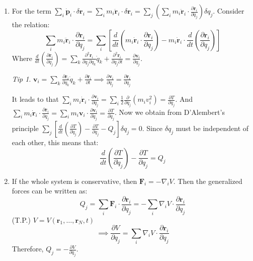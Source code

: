 \documentclass[12pt,a4paper]{article}
\theoremstyle{definition}
\theoremstyle{remark}
\newtheorem*{tip}{Tip}
\renewcommand{\vec}[1]{\mathbf{#1}}
\begin{document}
\begin{enumerate}
		\item For the term $\sum_i \dot{\vec{p}}_i \cdot \delta\vec{r}_i = \sum_i m_i \ddot{\vec{r}}_i \cdot \delta\vec{r}_i = \sum_j \left( \sum_i m_i \ddot{\vec{r}}_i \cdot \frac{\partial \vec{r}_i}{\partial q_j} \right) \delta q_j$.
		Consider the relation:
		\begin{equation*}
			\sum_i m_i \ddot{\vec{r}}_i \cdot \frac{\partial \vec{r}_i}{\partial q_j} = \sum_i \left[ \frac{d}{dt} \left( m_i \dot{\vec{r}}_i \cdot \frac{\partial \vec{r}_i}{\partial q_j} \right) - m_i \dot{\vec{r}}_i \cdot \frac{d}{dt} \left( \frac{\partial \vec{r}_i}{\partial q_j} \right) \right]
		\end{equation*}
		Where $\frac{d}{dt}(\frac{\partial \vec{r}_i}{\partial q_j}) = \sum_k \frac{\partial^2 \vec{r}_i}{\partial q_j \partial q_k}\dot{q}_k + \frac{\partial^2 \vec{r}_i}{\partial q_j \partial t} = \frac{\partial \vec{v}_i}{\partial q_j}$.
		\begin{tip}
			$\vec{v}_i = \sum_k \frac{\partial \vec{r}_i}{\partial q_k}\dot{q}_k + \frac{\partial \vec{r}_i}{\partial t} \implies \frac{\partial \vec{v}_i}{\partial \dot{q}_j} = \frac{\partial \vec{r}_i}{\partial q_j}$
		\end{tip}
		It leads to that $\sum_i m_i \dot{\vec{r}}_i \cdot \frac{\partial \vec{v}_i}{\partial q_j} = \sum_i \frac{1}{2} \frac{\partial}{\partial q_j}(m_i v_i^2) = \frac{\partial T}{\partial q_j}$.
		And $\sum_i m_i \dot{\vec{r}}_i \cdot \frac{\partial \vec{r}_i}{\partial q_j} = \sum_i m_i \vec{v}_i \cdot \frac{\partial \vec{v}_i}{\partial \dot{q}_j} = \frac{\partial T}{\partial \dot{q}_j}$.
		Now we obtain from D'Alembert's principle $\sum_j \left[ \frac{d}{dt}\left(\frac{\partial T}{\partial \dot{q}_j}\right) - \frac{\partial T}{\partial q_j} - Q_j \right] \delta q_j = 0$.
		Since $\delta q_j$ must be independent of each other, this means that:
		\begin{equation*}
			\frac{d}{dt}\left(\frac{\partial T}{\partial \dot{q}_j}\right) - \frac{\partial T}{\partial q_j} = Q_j
		\end{equation*}
		
		\item If the whole system is conservative, then $\vec{F}_i = -\nabla_i V$.
		Then the generalized forces can be written as:
		\begin{equation*}
			Q_j = \sum_i \vec{F}_i \cdot \frac{\partial \vec{r}_i}{\partial q_j} = -\sum_i \nabla_i V \cdot \frac{\partial \vec{r}_i}{\partial q_j}
		\end{equation*}
		(T.P.) $V=V(\vec{r}_1, \dots, \vec{r}_N, t)$
		\begin{equation*}
			\implies \frac{\partial V}{\partial q_j} = \sum_i \nabla_i V \cdot \frac{\partial \vec{r}_i}{\partial q_j}
		\end{equation*}
		Therefore, $Q_j = -\frac{\partial V}{\partial q_j}$.
		

\end{enumerate}
\end{document}
